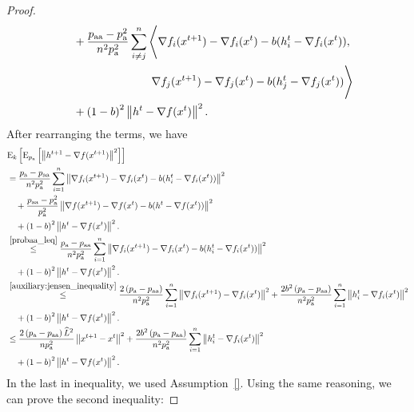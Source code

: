 \documentclass{article}
\newcommand*{\probavailable}{\ensuremath{p_{\textnormal{a}}}}
\newcommand*{\probpairaa}{\ensuremath{p_{\textnormal{aa}}}}
\begin{document}
\begin{proof}
\begin{align*}
    &\quad +\frac{\probpairaa - \probavailable^2}{n^2 \probavailable^2}\sum_{i \neq j}^n\Bigg\langle \nabla f_i(x^{t+1}) - \nabla f_i(x^{t}) - b(h^t_i - \nabla f_i(x^{t})), \\
    &\qquad\qquad\qquad\qquad \nabla f_j(x^{t+1}) - \nabla f_j(x^{t}) - b(h^t_j - \nabla f_j(x^{t}))\Bigg\rangle \\
    &\quad + \left(1 - b\right)^2 \norm{h^{t} - \nabla f(x^{t})}^2. \\
  \end{align*}
  After rearranging the terms, we have
  \begin{align*}
    &\ExpSub{k}{\ExpSub{\probavailable}{\norm{h^{t+1} - \nabla f(x^{t+1})}^2}} \\
    &= \frac{\probavailable - \probpairaa}{n^2 \probavailable^2} \sum_{i=1}^n \norm{\nabla f_i(x^{t+1}) - \nabla f_i(x^{t}) - b(h^t_i - \nabla f_i(x^{t}))}^2 \\
    &\quad + \frac{\probpairaa - \probavailable^2}{\probavailable^2} \norm{\nabla f(x^{t+1}) - \nabla f(x^{t}) - b(h^t - \nabla f(x^{t}))}^2 \\
    &\quad + \left(1 - b\right)^2 \norm{h^{t} - \nabla f(x^{t})}^2. \\
    &\overset{\eqref{probaa_leq}}{\leq}\frac{\probavailable - \probpairaa}{n^2 \probavailable^2} \sum_{i=1}^n \norm{\nabla f_i(x^{t+1}) - \nabla f_i(x^{t}) - b(h^t_i - \nabla f_i(x^{t}))}^2 \\
    &\quad + \left(1 - b\right)^2 \norm{h^{t} - \nabla f(x^{t})}^2. \\
    &\overset{\eqref{auxiliary:jensen_inequality}}{\leq}\frac{2\left(\probavailable - \probpairaa\right)}{n^2 \probavailable^2} \sum_{i=1}^n \norm{\nabla f_i(x^{t+1}) - \nabla f_i(x^{t})}^2 + \frac{2 b^2 \left(\probavailable - \probpairaa\right)}{n^2 \probavailable^2} \sum_{i=1}^n \norm{h^t_i - \nabla f_i(x^{t})}^2 \\
    &\quad + \left(1 - b\right)^2 \norm{h^{t} - \nabla f(x^{t})}^2. \\
    &\leq\frac{2\left(\probavailable - \probpairaa\right)\widehat{L}^2}{n \probavailable^2} \norm{x^{t+1} - x^{t}}^2 + \frac{2 b^2 \left(\probavailable - \probpairaa\right)}{n^2 \probavailable^2} \sum_{i=1}^n \norm{h^t_i - \nabla f_i(x^{t})}^2 \\
    &\quad + \left(1 - b\right)^2 \norm{h^{t} - \nabla f(x^{t})}^2. \\
  \end{align*}
  In the last in inequality, we used Assumption~\ref{}. Using the same reasoning, we can prove the second inequality:

\end{proof}
\end{document}
